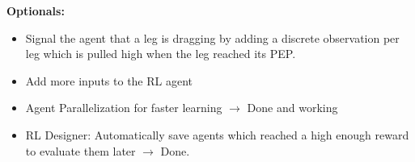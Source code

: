 \cite{lillicrap2015continuous}





\textbf{Optionals:}

\begin{itemize}
	\item Signal the agent that a leg is dragging by adding a discrete observation per leg which is pulled high when the leg reached its PEP.
	
	\item Add more inputs to the RL agent
	
	\item Agent Parallelization for faster learning $\rightarrow$ Done and working
	
	\item RL Designer: Automatically save agents which reached a high enough reward to evaluate them later $\rightarrow$ Done.
	
\end{itemize}




